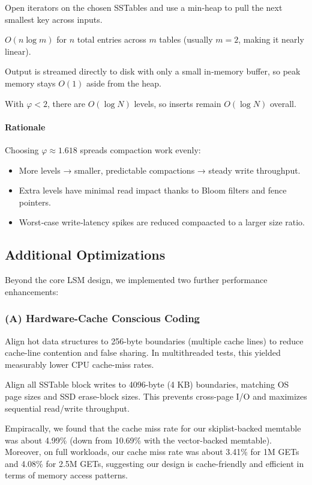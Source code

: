 \documentclass[10pt]{article}
\begin{document}
\begin{description}[leftmargin=1em,labelwidth=*,itemsep=0.5ex]
  \item[Streaming Merge] Open iterators on the chosen SSTables and use a min‐heap to pull the next smallest key across inputs.
  \item[Time Complexity] $O(n\log m)$ for $n$ total entries across $m$ tables (usually $m=2$, making it nearly linear).
  \item[Space Efficiency] Output is streamed directly to disk with only a small in‐memory buffer, so peak memory stays $O(1)$ aside from the heap.
  \item[Amortized Levels] With $\varphi<2$, there are $O(\log N)$ levels, so inserts remain $O(\log N)$ overall.
\end{description}

\paragraph{Rationale}
Choosing $\varphi\approx1.618$ spreads compaction work evenly:
\begin{itemize}[itemsep=0.25ex]
  \item More levels → smaller, predictable compactions → steady write throughput.
  \item Extra levels have minimal read impact thanks to Bloom filters and fence pointers.
  \item Worst‐case write‐latency spikes are reduced compaacted to a larger size ratio.
\end{itemize}

\subsection{Additional Optimizations}

Beyond the core LSM design, we implemented two further performance enhancements:

\subsubsection*{(A) Hardware-Cache Conscious Coding}
\begin{description}[leftmargin=1em,labelwidth=*,itemsep=0.5ex]
  \item[256-Byte Alignment]  
    Align hot data structures to 256-byte boundaries (multiple cache lines) to reduce cache-line contention and false sharing. In multithreaded tests, this yielded measurably lower CPU cache-miss rates.
  \item[4 KB Page Alignment]  
    Align all SSTable block writes to 4096-byte (4 KB) boundaries, matching OS page sizes and SSD erase-block sizes. This prevents cross-page I/O and maximizes sequential read/write throughput.
  \item[Great Cache Locality]  
    Empiracally, we found that the cache miss rate for our skiplist-backed memtable was about 4.99\% (down from 10.69\% with the vector-backed memtable). 
    Moreover, on full workloads, our cache miss rate was about 3.41\% for 1M GETs and 4.08\% for 2.5M GETs, suggesting our design is cache-friendly and efficient in terms of memory access patterns.
\end{description}
\end{document}
